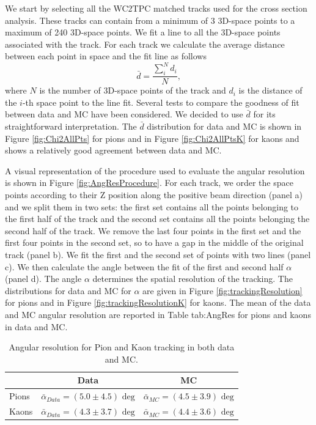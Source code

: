 We start by selecting all the WC2TPC matched tracks used for the cross section analysis.  These tracks can contain from a minimum of 3 3D-space points to a maximum of 240  3D-space points.  We fit a line to all the 3D-space points associated with the track. 
For each track we calculate the average distance between each point in space and the fit line as follows 
\begin{equation} 
\bar d = \frac{\sum^N_i d_i}{N},
\end{equation} 
where $N$ is the number of 3D-space points of the track and $d_i$ is the distance of the $i$-th space point to the line fit. Several tests to compare the goodness of fit between data and MC have been considered. We decided to use $\bar d$ for its straightforward interpretation. The $\bar d$ distribution for data and MC is shown in Figure \ref{fig:Chi2AllPts} for pions and in Figure \ref{fig:Chi2AllPtsK} for kaons and shows a relatively good agreement between data and MC.

A visual representation of the procedure used to evaluate the angular resolution is shown in Figure \ref{fig:AngResProcedure}. 
For each track, we order the space points according to their Z position along the positive beam direction (panel a) and we split them in two sets: the first set contains all the points belonging to the first half of the track and the second set contains all the points belonging the second half of the track. We remove the last four points in the first set and the first four points in the second set, so to have a gap in the middle of the original track (panel b). We fit the first and the second set of points with two lines  (panel c). We then calculate the angle between the fit of the first and second half $\alpha$ (panel d). The angle $\alpha$ determines the spatial resolution of the tracking. The distributions for data and MC for $\alpha$ are given in Figure \ref{fig:trackingResolution} for pions and in Figure \ref{fig:trackingResolutionK} for kaons. The mean of the data and MC angular resolution are reported in Table {tab:AngRes} for pions and kaons in data and MC.



\begin{table}[b]
\centering
\begin{tabular}{|l|c|c|}  
\hline
                      &       Data          & MC     \\ \hline
Pions             &   $\bar\alpha_{Data} = (5.0 \pm 4.5) \text{ deg}$          & $\bar\alpha_{MC} = (4.5 \pm 3.9) \text{ deg}$ \\ \hline
Kaons            &   $\bar\alpha_{Data} = (4.3 \pm 3.7) \text{ deg}$          & $\bar\alpha_{MC} = (4.4 \pm 3.6) \text{ deg}$  \\ \hline
\end{tabular}
\caption{Angular resolution for Pion and Kaon tracking in both data and MC.}
\label{tab:AngRes}
\end{table}


